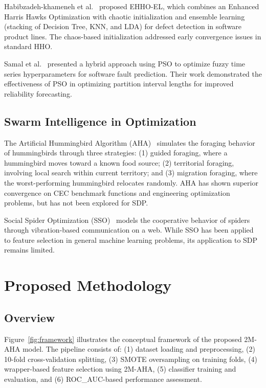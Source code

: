 \documentclass[conference,twocolumn]{IEEEtran}
\begin{document}
Habibzadeh-khameneh et al.~\cite{habibzadeh2025ehho} proposed EHHO-EL, which combines an Enhanced Harris Hawks Optimization with chaotic initialization and ensemble learning (stacking of Decision Tree, KNN, and LDA) for defect detection in software product lines. The chaos-based initialization addressed early convergence issues in standard HHO.

Samal et al.~\cite{samal2025hybrid} presented a hybrid approach using PSO to optimize fuzzy time series hyperparameters for software fault prediction. Their work demonstrated the effectiveness of PSO in optimizing partition interval lengths for improved reliability forecasting.

\subsection{Swarm Intelligence in Optimization}

The Artificial Hummingbird Algorithm (AHA)~\cite{zhao2022artificial} simulates the foraging behavior of hummingbirds through three strategies: (1) guided foraging, where a hummingbird moves toward a known food source; (2) territorial foraging, involving local search within current territory; and (3) migration foraging, where the worst-performing hummingbird relocates randomly. AHA has shown superior convergence on CEC benchmark functions and engineering optimization problems, but has not been explored for SDP.

Social Spider Optimization (SSO)~\cite{cuevas2013swarm} models the cooperative behavior of spiders through vibration-based communication on a web. While SSO has been applied to feature selection in general machine learning problems, its application to SDP remains limited.

\section{Proposed Methodology}\label{sec:methodology}

\subsection{Overview}

Figure~\ref{fig:framework} illustrates the conceptual framework of the proposed 2M-AHA model. The pipeline consists of: (1) dataset loading and preprocessing, (2) 10-fold cross-validation splitting, (3) SMOTE oversampling on training folds, (4) wrapper-based feature selection using 2M-AHA, (5) classifier training and evaluation, and (6) ROC\_AUC-based performance assessment.
\end{document}

